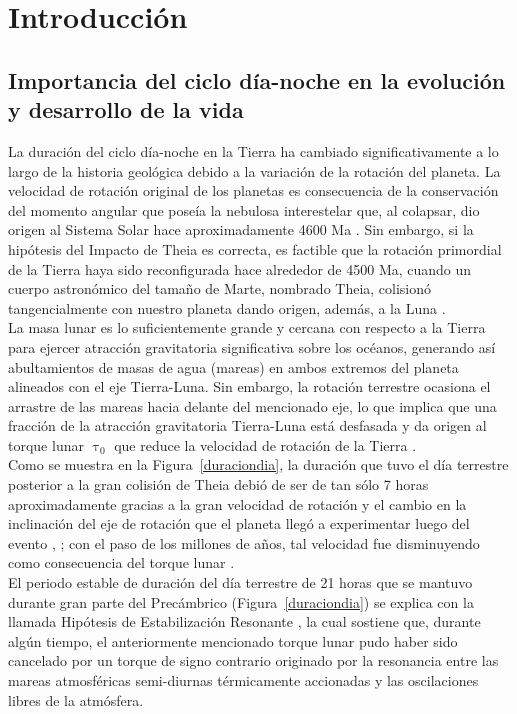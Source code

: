 \chapter{Introducción}

\section{Importancia del ciclo día-noche en la evolución y desarrollo de la vida}

La duración del ciclo día-noche en la Tierra ha cambiado significativamente a lo largo de la historia geológica debido a la variación de la rotación del planeta. La velocidad de rotación original de los planetas  es consecuencia de la conservación del momento angular que poseía la nebulosa interestelar que, al colapsar, dio origen al Sistema Solar hace aproximadamente 4600 Ma \citep{Greaves2005}. Sin embargo, si la hipótesis del Impacto de Theia es correcta, es factible que la rotación primordial de la Tierra haya sido reconfigurada hace alrededor de 4500 Ma, cuando un cuerpo astronómico del tamaño de Marte, nombrado Theia, colisionó tangencialmente con nuestro planeta dando origen, además, a la Luna \citep{Stevenson1987}.\\

La masa lunar es lo suficientemente grande y cercana con respecto a la Tierra para ejercer atracción gravitatoria significativa sobre los océanos, generando así abultamientos de masas de agua (mareas) en ambos extremos del planeta alineados con el eje Tierra-Luna. Sin embargo, la rotación terrestre ocasiona el arrastre de las mareas hacia delante del mencionado eje, lo que implica que una fracción de la atracción gravitatoria Tierra-Luna está desfasada y da origen al torque lunar $\uptau_0$ que reduce la velocidad de rotación de la Tierra \citep{Conway1982}.\\ 

Como se muestra en la Figura~\ref{duraciondia}, la duración que tuvo el día terrestre posterior a la gran colisión de Theia debió de ser de tan sólo 7 horas aproximadamente gracias a la gran velocidad de rotación y el cambio en la inclinación del eje de rotación que el planeta llegó a experimentar luego del evento \citep{Stevenson&Bartlett2016}, \citep{Stevenson1987}; con el paso de los millones de años, tal velocidad fue disminuyendo como consecuencia del torque lunar \citep{Conway1982}.\\ 

El periodo estable de duración del día terrestre de 21 horas que se mantuvo durante gran parte del Precámbrico (Figura~\ref{duraciondia}) se explica con la llamada Hipótesis de Estabilización Resonante \citep{Zahnle&Walker1987}, la cual sostiene que, durante algún tiempo, el anteriormente mencionado torque lunar pudo haber sido cancelado por un torque de signo contrario originado por la resonancia entre las mareas atmosféricas semi-diurnas térmicamente accionadas y las oscilaciones libres de la atmósfera.\\

